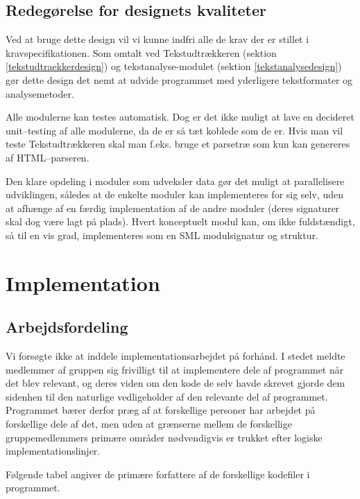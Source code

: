 \documentclass[a4paper,oneside]{memoir}
\begin{document}
\section{Redegørelse for designets kvaliteter}
Ved at bruge dette design vil vi kunne indfri alle de krav der er
stillet i kravspecifikationen. Som omtalt ved Tekstudtrækkeren
(sektion \ref{tekstudtraekkerdesign}) og tekstanalyse-modulet
(sektion \ref{tekstanalysedesign}) gør dette design det nemt at udvide
programmet med yderligere tekstformater og analysemetoder.

Alle modulerne kan testes automatisk. Dog er det ikke muligt at lave
en decideret unit--testing af alle modulerne, da de er så tæt koblede
som de er. Hvis man vil teste Tekstudtrækkeren skal man f.eks. bruge
et parsetræ som kun kan genereres af HTML--parseren.

Den klare opdeling i moduler som udveksler data gør det muligt at
parallelisere udviklingen, således at de enkelte moduler kan
implementeres for sig selv, uden at afhænge af en færdig
implementation af de andre moduler (deres signaturer skal dog være
lagt på plads). Hvert konceptuelt modul kan, om ikke fuldstændigt, så
til en vis grad, implementeres som en SML modulsignatur og struktur.

\chapter{Implementation}
\label{implementation}

\section{Arbejdsfordeling}

Vi forsøgte ikke at inddele implementationsarbejdet på forhånd. I
stedet meldte medlemmer af gruppen sig frivilligt til at implementere
dele af programmet når det blev relevant, og deres viden om den kode
de selv havde skrevet gjorde dem sidenhen til den naturlige
vedligeholder af den relevante del af programmet. Programmet bærer
derfor præg af at forskellige personer har arbejdet på forskellige
dele af det, men uden at grænserne mellem de forskellige
gruppemedlemmers primære områder nødvendigvis er trukket efter logiske
implementationslinjer.

Følgende tabel angiver de primære forfattere af de forskellige
kodefiler i programmet.
\end{document}
